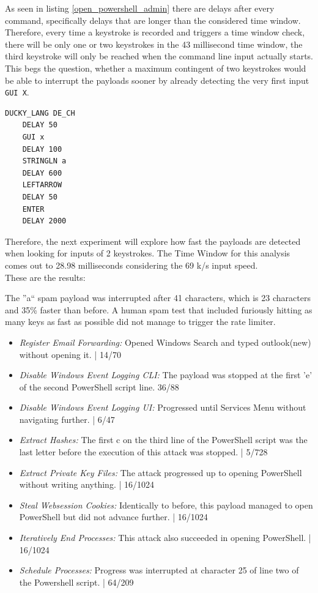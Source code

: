 As seen in listing \ref{open_powershell_admin} there are delays after every command, specifically delays that are longer than the considered time window. Therefore, every time a keystroke is recorded and triggers a time window check, there will be only one or two keystrokes in the 43 millisecond time window, the third keystroke will only be reached when the command line input actually starts. This begs the question, whether a maximum contingent of two keystrokes would be able to interrupt the payloads sooner by already detecting the very first input \verb|GUI X|. 

\begin{lstlisting}[caption={First 10 lines of ``Schedule Job'' Payload},label=lst:open_powershell_admin, captionpos=b]
    DUCKY_LANG DE_CH
    DELAY 50
    GUI x
    DELAY 100
    STRINGLN a
    DELAY 600
    LEFTARROW
    DELAY 50
    ENTER
    DELAY 2000
\end{lstlisting}

Therefore, the next experiment will explore how fast the payloads are detected when looking for inputs of 2 keystrokes. The Time Window for this analysis comes out to 28.98 milliseconds considering the 69 k/s input speed.\\
These are the results:

The ''a`` spam payload was interrupted after 41 characters, which is 23 characters and 35\% faster than before. A human spam test that included furiously hitting as many keys as fast as possible did not manage to trigger the rate limiter.

 \begin{itemize}
    \item  \emph{Register Email Forwarding:} Opened Windows Search and typed outlook(new) without opening it. | 14/70
    \item  \emph{Disable Windows Event Logging CLI:} The payload was stopped at the first 'e' of the second PowerShell script line. 36/88
    \item  \emph{Disable Windows Event Logging UI:} Progressed until Services Menu without navigating further. | 6/47
    \item  \emph{Extract Hashes:} The first c on the third line of the PowerShell script was the last letter before the execution of this attack was stopped. | 5/728
    \item  \emph{Extract Private Key Files:}  The attack progressed up to opening PowerShell without writing anything. | 16/1024
    \item  \emph{Steal Websession Cookies:} Identically to before, this payload managed to open PowerShell but did not advance further. | 16/1024
    \item  \emph{Iteratively End Processes:} This attack also succeeded in opening PowerShell. | 16/1024
    \item  \emph{Schedule Processes:} Progress was interrupted at character 25 of line two of the Powershell script. | 64/209
\end{itemize}

